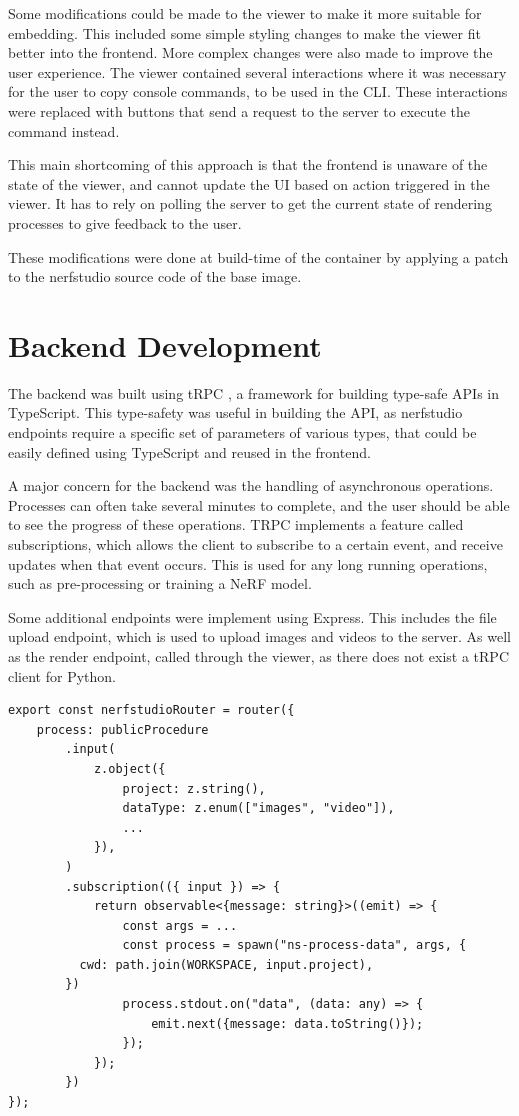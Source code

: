 Some modifications could be made to the viewer to make it more suitable for embedding.
This included some simple styling changes to make the viewer fit better into the frontend.
More complex changes were also made to improve the user experience.
The viewer contained several interactions where it was necessary for the user to copy console commands, to be used in the CLI.
These interactions were replaced with buttons that send a request to the server to execute the command instead.

This main shortcoming of this approach is that the frontend is unaware of the state of the viewer, and cannot update the UI based on action triggered in the viewer. 
It has to rely on polling the server to get the current state of rendering processes to give feedback to the user.

These modifications were done at build-time of the container by applying a patch to the nerfstudio source code of the base image.


\section{Backend Development}
\label{sec:system:backend}


The backend was built using tRPC \cite{noauthor_trpc_nodate}, a framework for building type-safe APIs in TypeScript.
This type-safety was useful in building the API, as nerfstudio endpoints require a specific set of parameters of various types, that could be easily defined using TypeScript and reused in the frontend.

A major concern for the backend was the handling of asynchronous operations.
Processes can often take several minutes to complete, and the user should be able to see the progress of these operations.
TRPC implements a feature called subscriptions, which allows the client to subscribe to a certain event, and receive updates when that event occurs.
This is used for any long running operations, such as pre-processing or training a NeRF model.

Some additional endpoints were implement using Express. 
This includes the file upload endpoint, which is used to upload images and videos to the server. 
As well as the render endpoint, called through the viewer, as there does not exist a tRPC client for Python. 

\begin{lstlisting}[style=ES6, caption=Example tRPC endpoint for Pre-Processing]
export const nerfstudioRouter = router({
	process: publicProcedure
		.input(
			z.object({
				project: z.string(),
				dataType: z.enum(["images", "video"]),
				...
			}),
		)
		.subscription(({ input }) => {
			return observable<{message: string}>((emit) => {
				const args = ...
				const process = spawn("ns-process-data", args, {
          cwd: path.join(WORKSPACE, input.project),
        })
				process.stdout.on("data", (data: any) => {
					emit.next({message: data.toString()});
				});
			});
		})
});
\end{lstlisting}


